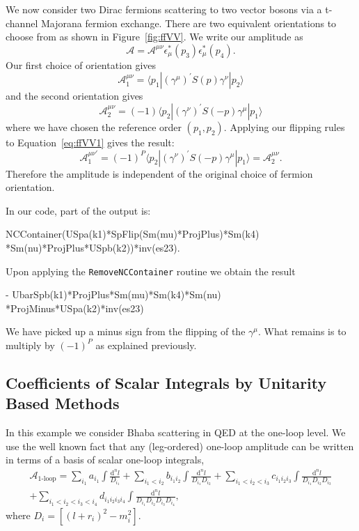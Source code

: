\documentclass[preprint,number,12pt,sort&compress]{elsarticle}
\begin{document}
We now consider two Dirac fermions scattering to two vector
bosons via a t-channel Majorana fermion exchange. 
There are two equivalent orientations to choose from as shown in Figure~\ref{fig:ffVV}.
We write our amplitude as 
\begin{equation} 
\mathcal{A} = \mathcal{A}^{\mu \nu} \epsilon^{*}_{\mu}(p_{3})
\epsilon^{*}_{\mu}(p_{4}).
\end{equation}
Our first choice of orientation gives 
\begin{equation} \label{eq:ffVV1}
\mathcal{A}^{\mu\nu}_{1} = \langle p_{1} | (\gamma^{\mu})^{'} S(p) \gamma^{\nu} | p_{2} \rangle
\end{equation}
and the second orientation gives
\begin{equation}
\mathcal{A}^{\mu\nu}_{2} = (-1) \langle p_{2} | (\gamma^{\nu})^{'} S(-p) \gamma^{\mu} | p_{1} \rangle
\end{equation}
where we have chosen the reference order $(p_{1}, p_{2})$.
Applying our flipping rules to Equation~\eqref{eq:ffVV1} gives the result:
\begin{equation}
\mathcal{A}^{\mu\nu '}_{1} = (-1)^{P} \langle p_{2} | (\gamma^{\nu})^{'} S(-p) \gamma^{\mu} | p_{1} \rangle =
\mathcal{A}^{\mu\nu}_{2}.
\end{equation}
Therefore the amplitude is independent of the original choice of fermion orientation.

In our code, part of the output is:
\begin{form}
NCContainer(USpa(k1)*SpFlip(Sm(mu)*ProjPlus)*Sm(k4)
 *Sm(nu)*ProjPlus*USpb(k2))*inv(es23).
\end{form}
Upon applying the \verb|RemoveNCContainer| routine we obtain the result
\begin{form}   
- UbarSpb(k1)*ProjPlus*Sm(mu)*Sm(k4)*Sm(nu)
 *ProjMinus*USpa(k2)*inv(es23)
\end{form}
We have picked up a minus sign from the flipping of the $\gamma^{\mu}$. 
What remains is to multiply by $(-1)^{P}$ as explained previously.


\subsection{Coefficients of Scalar Integrals by Unitarity Based Methods}
\label{ssec:ex:unitarity}
In this example we consider Bhaba scattering in QED at the one-loop level.
We use the well known fact that any (leg-ordered) one-loop amplitude
can be written in terms of a basis of scalar one-loop integrals,
\begin{multline}
\mathcal{A}_{\text{1-loop}}=
\sum_{i_1} a_{i_1}\int\frac{\mathrm{d}^nl}{D_{i_1}}
+\sum_{i_1<i_2} b_{i_1i_2}\int\frac{\mathrm{d}^nl}{D_{i_1}D_{i_2}}
+\sum_{i_1<i_2<i_3} c_{i_1i_2i_3}%
    \int\frac{\mathrm{d}^nl}{D_{i_1}D_{i_2}D_{i_3}}\\
+\sum_{i_1<i_2<i_3<i_4} d_{i_1i_2i_3i_4}%
   \int\frac{\mathrm{d}^nl}{D_{i_1}D_{i_2}D_{i_3}D_{i_4}},
\end{multline}
where $D_{i}=[(l+r_i)^2-m_i^2]$.
\end{document}
